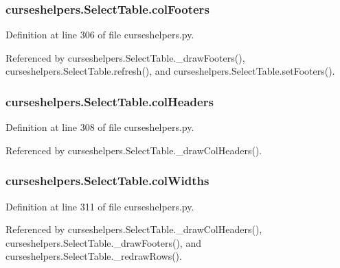 \subsubsection[{col\-Footers}]{\setlength{\rightskip}{0pt plus 5cm}curseshelpers.\-Select\-Table.\-col\-Footers}\label{classcurseshelpers_1_1SelectTable_a2920b0cf2b87179a9f7415e96275dba0}


Definition at line 306 of file curseshelpers.\-py.



Referenced by curseshelpers.\-Select\-Table.\-\_\-draw\-Footers(), curseshelpers.\-Select\-Table.\-refresh(), and curseshelpers.\-Select\-Table.\-set\-Footers().

\subsubsection[{col\-Headers}]{\setlength{\rightskip}{0pt plus 5cm}curseshelpers.\-Select\-Table.\-col\-Headers}\label{classcurseshelpers_1_1SelectTable_a0a89017f05b105c2a99aa82915be772b}


Definition at line 308 of file curseshelpers.\-py.



Referenced by curseshelpers.\-Select\-Table.\-\_\-draw\-Col\-Headers().

\subsubsection[{col\-Widths}]{\setlength{\rightskip}{0pt plus 5cm}curseshelpers.\-Select\-Table.\-col\-Widths}\label{classcurseshelpers_1_1SelectTable_ad0ed6bd276eaa2a082287b5aa4bc6e5a}


Definition at line 311 of file curseshelpers.\-py.



Referenced by curseshelpers.\-Select\-Table.\-\_\-draw\-Col\-Headers(), curseshelpers.\-Select\-Table.\-\_\-draw\-Footers(), and curseshelpers.\-Select\-Table.\-\_\-redraw\-Rows().

